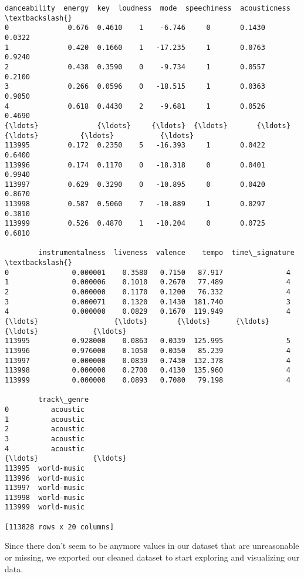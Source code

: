 \documentclass[11pt]{article}
\begin{document}
\begin{tcolorbox}[breakable, size=fbox, boxrule=.5pt, pad at break*=1mm, opacityfill=0]
\begin{Verbatim}[commandchars=\\\{\}]
        danceability  energy  key  loudness  mode  speechiness  acousticness  \textbackslash{}
0              0.676  0.4610    1    -6.746     0       0.1430        0.0322
1              0.420  0.1660    1   -17.235     1       0.0763        0.9240
2              0.438  0.3590    0    -9.734     1       0.0557        0.2100
3              0.266  0.0596    0   -18.515     1       0.0363        0.9050
4              0.618  0.4430    2    -9.681     1       0.0526        0.4690
{\ldots}              {\ldots}     {\ldots}  {\ldots}       {\ldots}   {\ldots}          {\ldots}           {\ldots}
113995         0.172  0.2350    5   -16.393     1       0.0422        0.6400
113996         0.174  0.1170    0   -18.318     0       0.0401        0.9940
113997         0.629  0.3290    0   -10.895     0       0.0420        0.8670
113998         0.587  0.5060    7   -10.889     1       0.0297        0.3810
113999         0.526  0.4870    1   -10.204     0       0.0725        0.6810

        instrumentalness  liveness  valence    tempo  time\_signature  \textbackslash{}
0               0.000001    0.3580   0.7150   87.917               4
1               0.000006    0.1010   0.2670   77.489               4
2               0.000000    0.1170   0.1200   76.332               4
3               0.000071    0.1320   0.1430  181.740               3
4               0.000000    0.0829   0.1670  119.949               4
{\ldots}                  {\ldots}       {\ldots}      {\ldots}      {\ldots}             {\ldots}
113995          0.928000    0.0863   0.0339  125.995               5
113996          0.976000    0.1050   0.0350   85.239               4
113997          0.000000    0.0839   0.7430  132.378               4
113998          0.000000    0.2700   0.4130  135.960               4
113999          0.000000    0.0893   0.7080   79.198               4

        track\_genre
0          acoustic
1          acoustic
2          acoustic
3          acoustic
4          acoustic
{\ldots}             {\ldots}
113995  world-music
113996  world-music
113997  world-music
113998  world-music
113999  world-music

[113828 rows x 20 columns]
\end{Verbatim}
\end{tcolorbox}
        
    Since there don't seem to be anymore values in our dataset that are
unreasonable or missing, we exported our cleaned dataset to start
exploring and visualizing our data.
\end{document}
